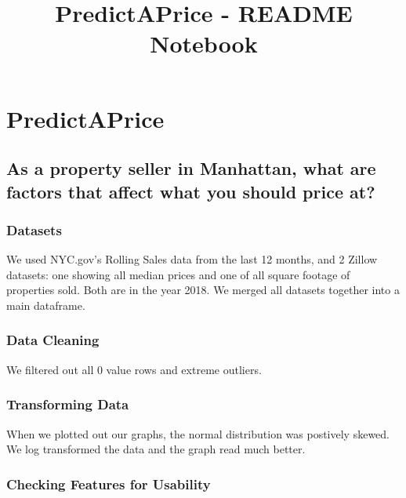 \documentclass[11pt]{article}
\title{PredictAPrice - README Notebook}
\begin{document}
    
    
    \maketitle
    
    

    
    \hypertarget{predictaprice}{%
\section{PredictAPrice}\label{predictaprice}}

\hypertarget{as-a-property-seller-in-manhattan-what-are-factors-that-affect-what-you-should-price-at}{%
\subsection{As a property seller in Manhattan, what are factors that
affect what you should price
at?}\label{as-a-property-seller-in-manhattan-what-are-factors-that-affect-what-you-should-price-at}}

\hypertarget{datasets}{%
\subsubsection{Datasets}\label{datasets}}

We used NYC.gov's Rolling Sales data from the last 12 months, and 2
Zillow datasets: one showing all median prices and one of all square
footage of properties sold. Both are in the year 2018. We merged all
datasets together into a main dataframe.

\hypertarget{data-cleaning}{%
\subsubsection{Data Cleaning}\label{data-cleaning}}

We filtered out all 0 value rows and extreme outliers.

\hypertarget{transforming-data}{%
\subsubsection{Transforming Data}\label{transforming-data}}

When we plotted out our graphs, the normal distribution was postively
skewed. We log transformed the data and the graph read much better.

\hypertarget{checking-features-for-usability}{%
\subsubsection{Checking Features for
Usability}\label{checking-features-for-usability}}
\end{document}
